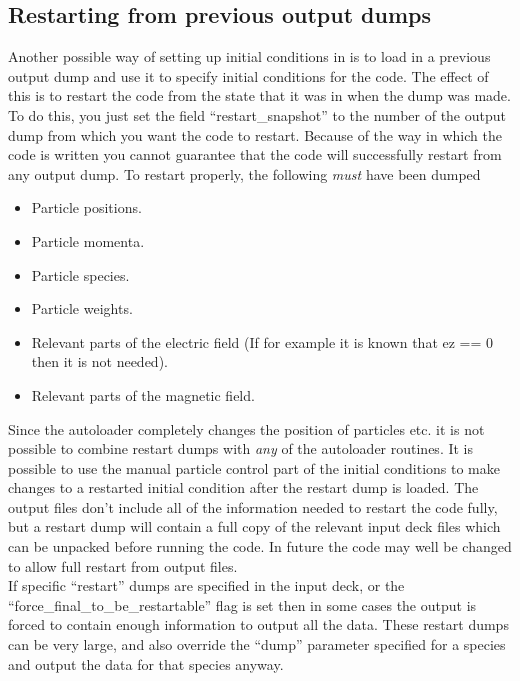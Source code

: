 \documentclass[12pt,a4paper]{article}
\newcommand{\EPOCH}{{\color{warwickdark}\fontfamily{phv}\selectfont{EPOCH}}}
\begin{document}
\subsection{Restarting {\EPOCH} from previous output dumps}
Another possible way of setting up initial conditions in {\EPOCH} is to load in
a previous output dump and use it to specify initial conditions for the
code. The effect of this is to restart the code from the state that it was in
when the dump was made. To do this, you just
set the field ``restart\_snapshot'' to
the number of the output dump from which you want the code to restart. Because
of the way in which the code is written you cannot guarantee that the code will
successfully restart from any output dump. To restart properly, the
following {\it must} have been dumped
\begin{itemize}
\item Particle positions.
\item Particle momenta.
\item Particle species.
\item Particle weights.
\item Relevant parts of the electric field (If for example it is known that
  ez == 0 then it is not needed).
\item Relevant parts of the magnetic field.
\end{itemize}
Since the autoloader completely changes the position of particles etc. it is
not possible to combine restart dumps with {\it any} of the autoloader
routines. It is possible to use the manual particle control part of the
initial conditions to make changes to a restarted initial condition after the
restart dump is loaded. The output files don't include all of the information
needed to restart the code fully, but a restart dump will contain a full copy
of the relevant input deck files which can be unpacked before running the
code. In future the code may well be changed to allow full restart from
output files.\\

If specific ``restart'' dumps are specified in the input deck, or the
``force\_final\_to\_be\_restartable'' flag is set then in some cases the
output is forced to contain enough information to output all the data. These
restart dumps can be very large, and also override the ``dump'' parameter
specified for a species and output the data for that species anyway.

\newpage
\end{document}
